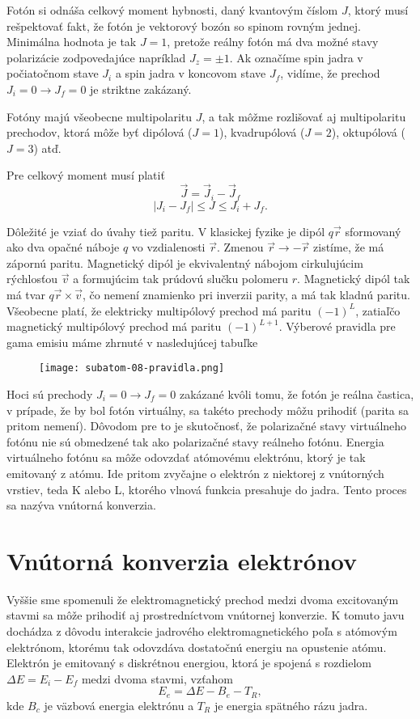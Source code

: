 \documentclass[../../main.tex]{subfiles}
\begin{document}
Fotón si odnáša celkový moment hybnosti, daný kvantovým číslom $J$, ktorý musí rešpektovať fakt, že fotón je vektorový bozón so spinom rovným jednej. Minimálna hodnota je tak $J=1$, pretože reálny fotón má dva možné stavy polarizácie zodpovedajúce napríklad $J_z=\pm 1$. Ak označíme spin jadra v počiatočnom stave $J_i$ a spin jadra v koncovom stave $J_f$, vidíme, že prechod $J_i=0 \rightarrow J_f=0$ je striktne zakázaný.

Fotóny majú všeobecne multipolaritu $J$, a tak môžme rozlišovať aj multipolaritu prechodov, ktorá môže byť dipólová ($J = 1$), kvadrupólová ($J = 2$), oktupólová ($J = 3$) atď.

Pre celkový moment musí platiť
$$ \vec{J} = \vec{J}_i - \vec{J}_f $$
$$ \vert J_i - J_f \vert \leq J \leq J_i + J_f. $$

Dôležité je vziať do úvahy tiež paritu. V klasickej fyzike je dipól $q\vec{r}$ sformovaný ako dva opačné náboje $q$ vo vzdialenosti $\vec{r}$. Zmenou $\vec{r} \rightarrow -\vec{r}$ zistíme, že má zápornú paritu. Magnetický dipól je ekvivalentný nábojom cirkulujúcim rýchlosťou $\vec{v}$ a formujúcim tak prúdovú slučku polomeru $r$. Magnetický dipól tak má tvar $q\vec{r} \times \vec{v}$, čo nemení znamienko pri inverzii parity, a má tak kladnú paritu. Všeobecne platí, že elektricky multipólový prechod má paritu $(-1)^L$, zatiaľčo magnetický multipólový prechod má paritu $(-1)^{L+1}$. Výberové pravidla pre gama emisiu máme zhrnuté v nasledujúcej tabuľke
\begin{figure}[!h]
\texttt{[image: subatom-08-pravidla.png]}
\centering
\end{figure}

Hoci sú prechody $J_i = 0 \rightarrow J_f = 0$ zakázané kvôli tomu, že fotón je reálna častica, v prípade, že by bol fotón virtuálny, sa takéto prechody môžu prihodiť (parita sa pritom nemení). Dôvodom pre to je skutočnosť, že polarizačné stavy virtuálneho fotónu nie sú obmedzené tak ako polarizačné stavy reálneho fotónu. Energia virtuálneho fotónu sa môže odovzdať atómovému elektrónu, ktorý je tak emitovaný z atómu. Ide pritom zvyčajne o elektrón z niektorej z vnútorných vrstiev, teda K alebo L, ktorého vlnová funkcia presahuje do jadra. Tento proces sa nazýva vnútorná konverzia.

\section{Vnútorná konverzia elektrónov}
Vyššie sme spomenuli že elektromagnetický prechod medzi dvoma excitovaným stavmi sa môže prihodiť aj prostredníctvom vnútornej konverzie. K tomuto javu dochádza z dôvodu interakcie jadrového elektromagnetického poľa s atómovým elektrónom, ktorému tak odovzdáva dostatočnú energiu na opustenie atómu. Elektrón je emitovaný s diskrétnou energiou, ktorá je spojená s rozdielom $\Delta E = E_i - E_f$ medzi dvoma stavmi, vzťahom
$$ E_e = \Delta E - B_e - T_R ,$$
kde $B_c$ je väzbová energia elektrónu a $T_R$ je energia spätného rázu jadra.
\end{document}
